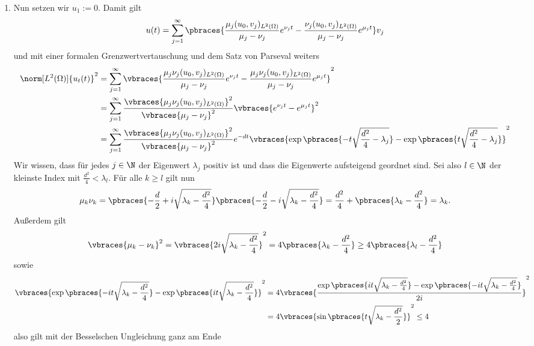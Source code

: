 \begin{solution}
\begin{enumerate}[label = (\roman*)]
	\item Nun setzen wir $u_1 := 0$. Damit gilt
	\begin{align*}
		u(t) = \sum_{j=1}^\infty \pbraces{\frac{\mu_j(u_0, v_j)_{L^2(\Omega)}}{\mu_j - \nu_j} e^{\nu_j t} - \frac{\nu_j(u_0, v_j)_{L^2(\Omega)}}{\mu_j - \nu_j} e^{\mu_j t}} v_j
	\end{align*}
	und mit einer formalen Grenzwertvertauschung und dem Satz von Parseval weiters
	\begin{align*}
		\norm[L^2(\Omega)]{u_t(t)}^2 &= \sum_{j=1}^\infty \vbraces{\frac{\mu_j\nu_j(u_0, v_j)_{L^2(\Omega)}}{\mu_j - \nu_j} e^{\nu_j t} - \frac{\mu_j\nu_j(u_0, v_j)_{L^2(\Omega)}}{\mu_j - \nu_j} e^{\mu_j t}}^2 \\
		&= \sum_{j=1}^\infty \frac{\vbraces{\mu_j\nu_j(u_0, v_j)_{L^2(\Omega)}}^2}{\vbraces{\mu_j - \nu_j}^2} \vbraces{e^{\nu_j t} - e^{\mu_j t}}^2 \\
		&= \sum_{j=1}^\infty \frac{\vbraces{\mu_j\nu_j(u_0, v_j)_{L^2(\Omega)}}^2}{\vbraces{\mu_j - \nu_j}^2} e^{-d t}\vbraces{\exp\pbraces{-t\sqrt{\frac{d^2}{4} - \lambda_j} } - \exp\pbraces{t\sqrt{\frac{d^2}{4} - \lambda_j} }}^2
	\end{align*}
	Wir wissen, dass für jedes $j \in \N$ der Eigenwert $\lambda_j$ positiv ist und dass die Eigenwerte aufsteigend geordnet sind. Sei also $l \in \N$ der kleinste Index mit $\frac{d^2}{4} < \lambda_l$. Für alle $k \geq l$ gilt nun
	\begin{align*}
		\mu_k \nu_k = \pbraces{-\frac{d}{2} + i \sqrt{\lambda_k - \frac{d^2}{4}}}\pbraces{-\frac{d}{2} - i \sqrt{\lambda_k - \frac{d^2}{4}}} = \frac{d^2}{4} + \pbraces{\lambda_k - \frac{d^2}{4}} = \lambda_k.
	\end{align*}
	Außerdem gilt
	\begin{align*}
		\vbraces{\mu_k - \nu_k}^2 = \vbraces{2 i \sqrt{\lambda_k - \frac{d^2}{4}}}^2 = 4 \pbraces{\lambda_k - \frac{d^2}{4}} \geq 4 \pbraces{\lambda_l - \frac{d^2}{4}}
	\end{align*}
	sowie
	\begin{align*}
		\vbraces{\exp\pbraces{-i t \sqrt{\lambda_k - \frac{d^2}{4}} } - \exp\pbraces{i t \sqrt{\lambda_k - \frac{d^2}{4}} }}^2 &= 4 \vbraces{\frac{\exp\pbraces{i t \sqrt{\lambda_k - \frac{d^2}{4}}} - \exp\pbraces{-i t \sqrt{\lambda_k - \frac{d^2}{4}} }}{2i}}^2  \\
		&= 4 \vbraces{\sin\pbraces{t \sqrt{\lambda_k - \frac{d^2}{2}}}}^2 \leq 4
	\end{align*}
	also gilt mit der Besselschen Ungleichung ganz am Ende
	\begin{align*}

\end{align*}
\end{enumerate}
\end{solution}
